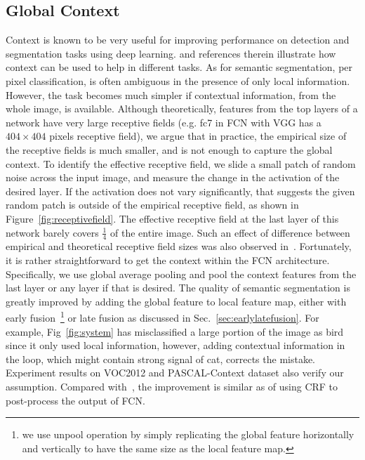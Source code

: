 \documentclass{article} %
\begin{document}
\subsection{Global Context}
Context is known to be very useful for improving performance on detection and segmentation tasks using deep learning. \cite{mostajabi2014feedforward, szegedy2014scalable} and references therein illustrate how context can be used to help in different tasks. As for semantic segmentation, per pixel classification, is often ambiguous in the presence of only local information. However, the task becomes much simpler if contextual information, from the whole image, is available. Although theoretically, features from the top layers of a network have very large receptive fields (e.g. fc7 in FCN with VGG has a $404 \times 404$ pixels receptive field), we argue that in practice, the empirical size of the receptive fields is much smaller, and is not enough to capture the global context. To identify the effective receptive field, we slide a small patch of random noise across the input image, and measure the change in the activation of the desired layer. If the activation does not vary significantly, that suggests the given random patch is outside of the empirical receptive field, as shown in Figure~\ref{fig:receptivefield}. The effective receptive field at the last layer of this network barely covers $\frac{1}{4}$ of the entire image. Such an effect of difference between empirical and theoretical receptive field sizes was also observed in~\cite{zhou2014object}. Fortunately, it is rather straightforward to get the context within the FCN architecture. Specifically, we use global average pooling and pool the context features from the last layer or any layer if that is desired. The quality of semantic segmentation is greatly improved by adding the global feature to local feature map, either with early fusion~\footnote{we use unpool operation by simply replicating the global feature horizontally and vertically to have the same size as the local feature map.} or late fusion as discussed in Sec.~\ref{sec:earlylatefusion}. For example, Fig~\ref{fig:system} has misclassified a large portion of the image as bird since it only used local information, however, adding contextual information in the loop, which might contain strong signal of cat, corrects the mistake. Experiment results on VOC2012 and PASCAL-Context dataset also verify our assumption. Compared with~\cite{chen2014semantic}, the improvement is similar as of using CRF to post-process the output of FCN.
\end{document}
